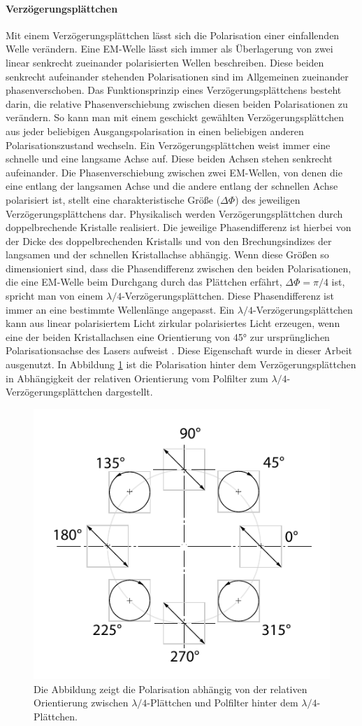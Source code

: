 \documentclass[titlepage]{article}
\begin{document}
	\paragraph{Verzögerungsplättchen}
	Mit einem Verzögerungsplättchen lässt sich die Polarisation einer einfallenden Welle verändern. Eine EM-Welle lässt sich immer als Überlagerung von zwei linear senkrecht zueinander polarisierten Wellen beschreiben. Diese beiden senkrecht aufeinander stehenden Polarisationen sind im Allgemeinen zueinander phasenverschoben. Das Funktionsprinzip eines Verzögerungsplättchens besteht darin, die relative Phasenverschiebung zwischen diesen beiden Polarisationen zu verändern. So kann man mit einem geschickt gewählten Verzögerungsplättchen aus jeder beliebigen Ausgangspolarisation in einen beliebigen anderen Polarisationszustand wechseln. Ein Verzögerungsplättchen weist immer eine schnelle und eine langsame Achse auf. Diese beiden Achsen stehen senkrecht aufeinander. Die Phasenverschiebung zwischen zwei EM-Wellen, von denen die eine entlang der langsamen Achse und die andere entlang der schnellen Achse polarisiert ist, stellt eine charakteristische Größe ($\Delta\Phi$) des jeweiligen Verzögerungsplättchens dar. Physikalisch  werden Verzögerungsplättchen durch doppelbrechende Kristalle realisiert. Die jeweilige Phasendifferenz ist hierbei von der Dicke des doppelbrechenden Kristalls und von den Brechungsindizes der langsamen und der schnellen Kristallachse abhängig. Wenn diese Größen so dimensioniert sind, dass die Phasendifferenz zwischen den beiden Polarisationen, die eine EM-Welle beim Durchgang durch das Plättchen erfährt, $\Delta \Phi = \pi /4 $ ist, spricht man von einem  $\lambda /4$-Verzögerungsplättchen. Diese Phasendifferenz ist immer an eine bestimmte Wellenlänge angepasst.  Ein $\lambda /4$-Verzögerungsplättchen kann aus linear polarisiertem Licht zirkular polarisiertes Licht erzeugen, wenn eine der beiden Kristallachsen eine Orientierung von 45° zur ursprünglichen Polarisationsachse des Lasers aufweist \cite{Hecht.2018}. Diese Eigenschaft wurde in dieser Arbeit ausgenutzt. In Abbildung \ref{fig:polarisationlambda} ist die Polarisation hinter dem Verzögerungsplättchen in Abhängigkeit der relativen Orientierung vom Polfilter zum $\lambda /4$-Verzögerungsplättchen dargestellt. 
	\begin{figure}
		\centering
		\includegraphics[width=0.5\linewidth]{figures/Polarisation_lambda}
		\caption[Polarisation $\lambda/4$-Plättchen]{Die Abbildung zeigt die Polarisation abhängig von der relativen Orientierung zwischen $\lambda/4$-Plättchen und Polfilter hinter dem $\lambda/4$-Plättchen.}
		\label{fig:polarisationlambda}
	\end{figure}
	
\end{document}
